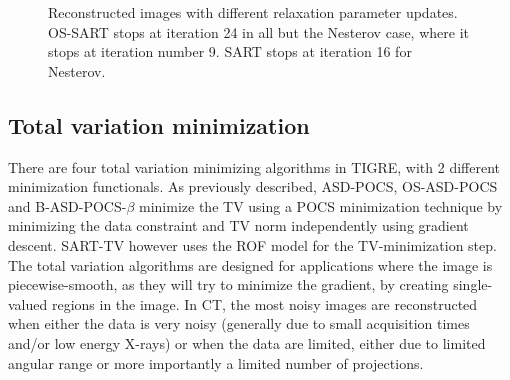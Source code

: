 \begin{figure}
\centering
{}
\caption[Reconstructed images with different relaxation parameter updates]{\label{fig:SARTlambdaplot}Reconstructed images with different relaxation parameter updates. OS-SART stops at iteration 24 in all but the Nesterov case, where it stops at iteration number 9. SART stops at iteration 16 for Nesterov.}
\end{figure}



\subsection{Total variation minimization}
There are four total variation minimizing algorithms in TIGRE, with 2 different minimization functionals. As previously described, ASD-POCS, OS-ASD-POCS and B-ASD-POCS-$\beta$ minimize the TV using a POCS minimization technique by minimizing the data constraint and TV norm independently using gradient descent. SART-TV however uses the ROF model for the TV-minimization step. The total variation algorithms are designed for applications where the image is piecewise-smooth, as they will try to minimize the gradient, by creating single-valued regions in the image. In CT, the most noisy images are reconstructed when either the data is very noisy (generally due to small acquisition times and/or low energy X-rays) or when the data are limited, either due to limited angular range or more importantly a limited number of projections. 

